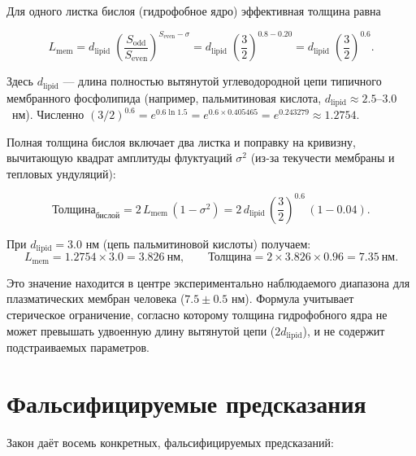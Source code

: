 \documentclass[12pt,a4paper]{article}
\theoremstyle{remark}
\begin{document}
	Для одного листка бислоя (гидрофобное ядро) эффективная толщина равна
	
	\begin{equation}
		L_{\mathrm{mem}} = d_{\mathrm{lipid}} \;
		\left( \frac{S_{\mathrm{odd}}}{S_{\mathrm{even}}} \right)^{S_{\mathrm{even}} - \sigma}
		= d_{\mathrm{lipid}} \;
		\left( \frac{3}{2} \right)^{0.8 - 0.20}
		= d_{\mathrm{lipid}} \;
		\left( \frac{3}{2} \right)^{0.6}.
	\end{equation}
	
	Здесь \(d_{\mathrm{lipid}}\) --- длина полностью вытянутой углеводородной цепи типичного мембранного фосфолипида (например, пальмитиновая кислота, \(d_{\mathrm{lipid}} \approx 2.5\)--\(3.0\)~нм). Численно \((3/2)^{0.6} = e^{0.6\ln 1.5} = e^{0.6 \times 0.405465} = e^{0.243279} \approx 1.2754\).
	
	Полная толщина бислоя включает два листка и поправку на кривизну, вычитающую квадрат амплитуды флуктуаций \(\sigma^2\) (из-за текучести мембраны и тепловых ундуляций):
	
	\begin{equation}
		\boxed{\text{Толщина}_{\text{бислой}} = 2 \, L_{\mathrm{mem}} \,
			(1 - \sigma^2) = 2 \, d_{\mathrm{lipid}} \,
			\left( \frac{3}{2} \right)^{0.6} \, (1 - 0.04)}.
	\end{equation}
	
	При \(d_{\mathrm{lipid}} = 3.0\) нм (цепь пальмитиновой кислоты) получаем:
	\[
	L_{\mathrm{mem}} = 1.2754 \times 3.0 = 3.826\ \text{нм},
	\qquad
	\text{Толщина} = 2 \times 3.826 \times 0.96 = 7.35\ \text{нм}.
	\]
	
	Это значение находится в центре экспериментально наблюдаемого диапазона для плазматических мембран человека (\(7.5 \pm 0.5\) нм). Формула учитывает стерическое ограничение, согласно которому толщина гидрофобного ядра не может превышать удвоенную длину вытянутой цепи (\(2 d_{\mathrm{lipid}}\)), и не содержит подстраиваемых параметров.
	
	\section{Фальсифицируемые предсказания}
	\label{sec:predictions}
	
	Закон даёт восемь конкретных, фальсифицируемых предсказаний:
	
\end{document}
